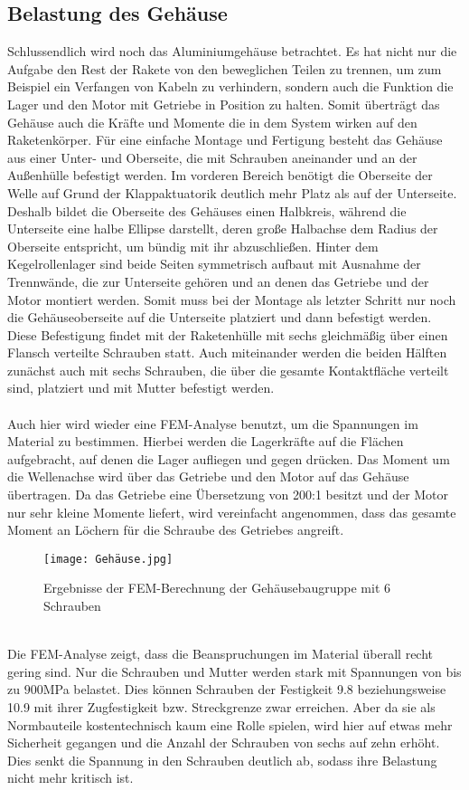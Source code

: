 \subsection{Belastung des Gehäuse}
Schlussendlich wird noch das Aluminiumgehäuse betrachtet. Es hat nicht nur die Aufgabe den Rest der Rakete von den beweglichen Teilen zu trennen, um zum Beispiel ein Verfangen von Kabeln zu verhindern, sondern auch die Funktion die Lager und den Motor mit Getriebe in Position zu halten. Somit überträgt das Gehäuse auch die Kräfte und Momente die in dem System wirken auf den Raketenkörper. Für eine einfache Montage und Fertigung besteht das Gehäuse aus einer Unter- und Oberseite, die mit Schrauben aneinander und an der Außenhülle befestigt werden. Im vorderen Bereich benötigt die Oberseite der Welle auf Grund der Klappaktuatorik deutlich mehr Platz als auf der Unterseite. Deshalb bildet die Oberseite des Gehäuses einen Halbkreis, während die Unterseite eine halbe Ellipse darstellt, deren große Halbachse dem Radius der Oberseite entspricht, um bündig mit ihr abzuschließen. Hinter dem Kegelrollenlager sind beide Seiten symmetrisch aufbaut mit Ausnahme der Trennwände, die zur Unterseite gehören und an denen das Getriebe und der Motor montiert werden. Somit muss bei der Montage als letzter Schritt nur noch die Gehäuseoberseite auf die Unterseite platziert und dann befestigt werden.
Diese Befestigung findet mit der Raketenhülle mit sechs gleichmäßig über einen Flansch verteilte Schrauben statt. Auch miteinander werden die beiden Hälften zunächst auch mit sechs Schrauben, die über die gesamte Kontaktfläche verteilt sind, platziert und mit Mutter befestigt werden.
\\~\\
Auch hier wird wieder eine FEM-Analyse benutzt, um die Spannungen im Material zu bestimmen. Hierbei werden die Lagerkräfte auf die Flächen aufgebracht, auf denen die Lager aufliegen und gegen drücken. Das Moment um die Wellenachse wird über das Getriebe und den Motor auf das Gehäuse übertragen. Da das Getriebe eine Übersetzung von 200:1 besitzt und der Motor nur sehr kleine Momente liefert, wird vereinfacht angenommen, dass das gesamte Moment an Löchern für die Schraube des Getriebes angreift.
\begin{figure}[h] 
	\centering
	\texttt{[image: Gehäuse.jpg]}
	\caption{Ergebnisse der FEM-Berechnung der Gehäusebaugruppe mit 6 Schrauben}
\end{figure}\\
Die FEM-Analyse zeigt, dass die Beanspruchungen im Material überall recht gering sind. Nur die Schrauben und Mutter werden stark mit Spannungen von bis zu $900$MPa belastet. Dies können Schrauben der Festigkeit 9.8 beziehungsweise 10.9 mit ihrer Zugfestigkeit bzw. Streckgrenze zwar erreichen. Aber da sie als Normbauteile kostentechnisch kaum eine Rolle spielen, wird hier auf etwas mehr Sicherheit gegangen und die Anzahl der Schrauben von sechs auf zehn erhöht. Dies senkt die Spannung in den Schrauben deutlich ab, sodass ihre Belastung nicht mehr kritisch ist.\\
